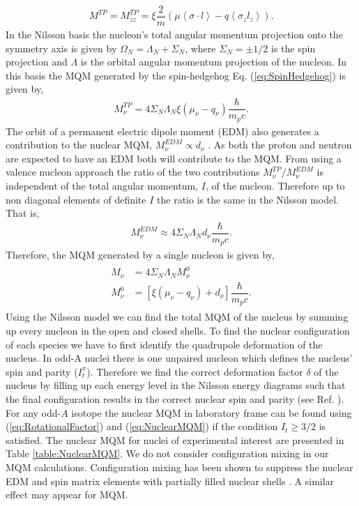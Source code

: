 \documentclass[10pt,a4paper, twoside]{report}
\begin{document}
\begin{align}
M^{TP}  = M_{zz}^{TP} = \xi\dfrac{2}{m}\left(\mu\left<\sigma\cdot l \right> - q\left<\sigma_z l_z\right>\right) .
\end{align}
In the Nilsson basis \cite{Nilsson1955} the nucleon's total angular momentum projection onto the symmetry axis is given by $\Omega_N = \Lambda_N + \Sigma_N$, where $\Sigma_N = \pm 1/2$ is the spin projection and $\Lambda$ is the orbital angular momentum projection of the nucleon. In this basis the MQM  generated by the spin-hedgehog Eq. (\ref{eq:SpinHedgehog}) is given by,
\begin{align}
M^{TP}_{\nu} = 4\Sigma_N\Lambda_N\xi\left(\mu_{\nu} - q_{\nu}\right)\dfrac{\hbar}{m_p c}.
\end{align} 
The orbit of a permanent electric dipole moment (EDM) also  generates a contribution to the nuclear MQM, $M_{\nu}^{EDM} \propto d_{\nu}$ \cite{Khriplovich1976}. As both the proton and neutron are expected to have an EDM both will contribute to the MQM. From \cite{Flambaum2014} using a valence nucleon approach the ratio of the two contributions $M^{TP}_{\nu}/M_{\nu}^{EDM}$ is independent of the total angular momentum, $I$, of the nucleon. Therefore up to non diagonal elements of definite $I$ the ratio is the same in the Nilsson model. That is,
\begin{align}
M_{\nu}^{EDM} \approx  4\Sigma_N\Lambda_N d_{\nu}\dfrac{\hbar}{m_p c}.
\end{align}
Therefore, the MQM generated by a single nucleon is given by,
\begin{align}\label{eq:NuclearMQM} 
\begin{split}
M_{\nu} &= 4\Sigma_N\Lambda_N M_{\nu}^0 \\ 
M_{\nu}^0 &= \left[\xi\left(\mu_{\nu} - q_{\nu}\right) + d_{\nu}\right]\dfrac{\hbar}{m_p c}. 
\end{split}
\end{align}
Using the Nilsson model we can find the total MQM of the nucleus by summing up every nucleon in the open and closed shells. To find the nuclear configuration of each species we have to first identify the quadrupole deformation of the nucleus. In  odd-A nuclei there is  one unpaired nucleon which defines the nucleus' spin  and parity ($I_t^{\pi}$). Therefore we find the correct deformation factor $\delta$ of the nucleus by filling up each energy level in the Nilsson energy diagrams \cite{BohrMottVol2} such that the final configuration results in the correct nuclear spin and parity (see Ref. \cite{BF2018}).   For any odd-$A$ isotope the nuclear MQM in laboratory frame can be found  using (\ref{eq:RotationalFactor})  and (\ref{eq:NuclearMQM}) if the condition $I_t \geq 3/2$ is satisfied. The nuclear MQM  for nuclei of experimental interest are presented in  Table \ref{table:NuclearMQM}. We do not consider configuration mixing in our MQM calculations. Configuration mixing has been shown to suppress the nuclear EDM and spin matrix elements with partially filled nuclear shells \cite{Yoshinaga2010, Yoshinaga2014, Yamanaka2017}. A similar effect may appear for MQM. \\
\end{document}
